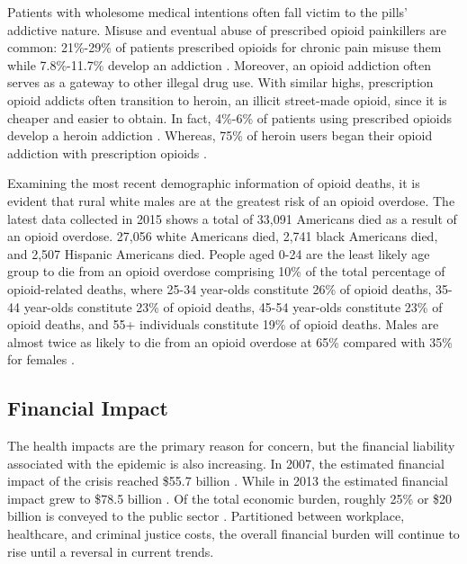 \documentclass[sigconf]{acmart}
\begin{document}
 Patients with wholesome medical intentions often fall victim to the pills' addictive nature. Misuse and eventual abuse of prescribed opioid painkillers are common: 21\%-29\% of patients prescribed opioids for chronic pain misuse them while 7.8\%-11.7\% develop an addiction \cite{Vowles01}. Moreover, an opioid addiction often serves as a gateway to other illegal drug use. With similar highs, prescription opioid addicts often transition to heroin, an illicit street-made opioid, since it is cheaper and easier to obtain. In fact, 4\%-6\% of patients using prescribed opioids develop a heroin addiction \cite{opsis1}. Whereas, 75\% of heroin users began their opioid addiction with prescription opioids \cite{Cicero01}.
 
 Examining the most recent demographic information of opioid deaths, it is evident that rural white males are at the greatest risk of an opioid overdose. The latest data collected in 2015 shows a total of 33,091 Americans died as a result of an opioid overdose. 27,056 white Americans died, 2,741 black Americans died, and 2,507 Hispanic Americans died. People aged 0-24 are the least likely age group to die from an opioid overdose comprising 10\% of the total percentage of opioid-related deaths, where 25-34 year-olds constitute 26\% of opioid deaths, 35-44 year-olds constitute 23\% of opioid deaths, 45-54 year-olds constitute 23\% of opioid deaths, and 55+ individuals constitute 19\% of opioid deaths. Males are almost twice as likely to die from an opioid overdose at 65\% compared with 35\% for females \cite{opsis4}.

\subsection{Financial Impact} 
The health impacts are the primary reason for concern, but the financial liability associated with the epidemic is also increasing. In 2007, the estimated financial impact of the crisis reached \$55.7 billion \cite{Birnbaum01}. While in 2013 the estimated financial impact grew to \$78.5 billion \cite{Florence01}. Of the total economic burden, roughly 25\% or \$20 billion is conveyed to the public sector \cite{Florence01}. Partitioned between workplace, healthcare, and criminal justice costs, the overall financial burden will continue to rise until a reversal in current trends. 
\end{document}

